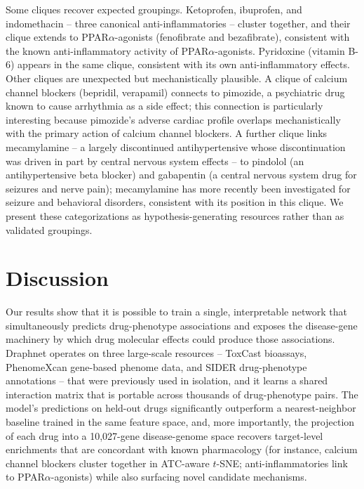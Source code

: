 \documentclass[11pt]{article}
\begin{document}
Some cliques recover expected groupings. Ketoprofen, ibuprofen, and
indomethacin -- three canonical anti-inflammatories -- cluster together,
and their clique extends to PPAR$\alpha$-agonists (fenofibrate and
bezafibrate), consistent with the known anti-inflammatory activity of
PPAR$\alpha$-agonists. Pyridoxine (vitamin B-6) appears in the same
clique, consistent with its own anti-inflammatory effects. Other
cliques are unexpected but mechanistically plausible. A clique of
calcium channel blockers (bepridil, verapamil) connects to pimozide, a
psychiatric drug known to cause arrhythmia as a side effect; this
connection is particularly interesting because pimozide's adverse
cardiac profile overlaps mechanistically with the primary action of
calcium channel blockers. A further clique links mecamylamine -- a
largely discontinued antihypertensive whose discontinuation was driven
in part by central nervous system effects -- to pindolol (an
antihypertensive beta blocker) and gabapentin (a central nervous
system drug for seizures and nerve pain); mecamylamine has more
recently been investigated for seizure and behavioral disorders,
consistent with its position in this clique. We present these
categorizations as hypothesis-generating resources rather than as
validated groupings.

\section{Discussion}

Our results show that it is possible to train a single, interpretable
network that simultaneously predicts drug-phenotype associations and
exposes the disease-gene machinery by which drug molecular effects
could produce those associations. Draphnet operates on three
large-scale resources -- ToxCast bioassays, PhenomeXcan gene-based
phenome data, and SIDER drug-phenotype annotations -- that were
previously used in isolation, and it learns a shared interaction
matrix that is portable across thousands of drug-phenotype pairs. The
model's predictions on held-out drugs significantly outperform a
nearest-neighbor baseline trained in the same feature space, and,
more importantly, the projection of each drug into a 10,027-gene
disease-genome space recovers target-level enrichments that are
concordant with known pharmacology (for instance, calcium channel
blockers cluster together in ATC-aware $t$-SNE; anti-inflammatories
link to PPAR$\alpha$-agonists) while also surfacing novel candidate
mechanisms.
\end{document}
